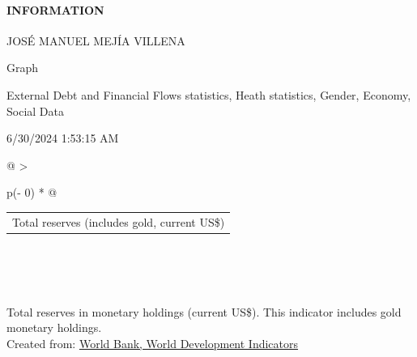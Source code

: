 \documentclass[
]{article}
\providecommand{\tightlist}{%
  \setlength{\itemsep}{0pt}\setlength{\parskip}{0pt}}
\newenvironment{LTR}{\beginL}{\endL}
\begin{document}
\begin{itemize}
  \hypertarget{infoLinkDesc}{}
  \hypertarget{information}{%
  \paragraph{\texorpdfstring{INFORMATION
  {}}{INFORMATION }}\label{information}}

  \hypertarget{reportDescription}{}
  \begin{description}
  \tightlist
  \item[Created by]
  JOSÉ MANUEL MEJÍA VILLENA
  \item[Description]
  Graph
  \item[Tags]
  External Debt and Financial Flows statistics, Heath statistics,
  Gender, Economy, Social Data
  \item[Last Updated]
  6/30/2024 1:53:15 AM
  \end{description}
\end{itemize}

\protect\hypertarget{fullScreen}{\href{javascript:void(0)}{}}

\begin{longtable}[]{@{}
  >{\raggedright\arraybackslash}p{(\columnwidth - 0\tabcolsep) * }@{}}
\toprule\noalign{}
\endhead
\bottomrule\noalign{}
\endlastfoot
\begin{minipage}[t]{\linewidth}\raggedright
\hypertarget{REPORT_PREVIEW_divdropdown}{}
\begin{longtable}[]{@{}l@{}}
\toprule\noalign{}
\endhead
\bottomrule\noalign{}
\endlastfoot
Total reserves (includes gold, current US\$)
\protect\hypertarget{REPORT_PREVIEW_meta_link_page_WDI_Series}{}{{{}}} \\
\end{longtable}
\end{minipage} \\
 \\
\begin{minipage}[t]{\linewidth}\raggedright
\hypertarget{container}{}
\begin{LTR}
\end{LTR}
\end{minipage} \\
\protect\hypertarget{REPORT_PREVIEW_lblXAxis}{}{}
\protect\hypertarget{REPORT_PREVIEW_lblFooter}{}{Total reserves in
monetary holdings (current US\$). This indicator includes gold monetary
holdings.} \\
\protect\hypertarget{REPORT_PREVIEW_sReportSource}{}{Created from:}
\protect\hypertarget{REPORT_PREVIEW_hplDatabaseName}{\href{javascript:Shared(\textquotesingle{}/Total-reserves-in-monetary-holdings-(currents-US$)/id/97e02e7c\textquotesingle{});}{World
Bank, World Development Indicators}} \\
\textbf{} \protect\hypertarget{REPORT_PREVIEW_sDisclaimerMsg}{}{ } \\
\end{longtable}
\end{document}
